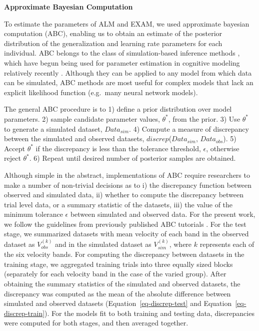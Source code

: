 \documentclass[
  12pt,
  letterpaper,
]{article}
\begin{document}
\begin{tcolorbox}[enhanced jigsaw, toprule=.15mm, leftrule=.75mm, colframe=quarto-callout-color-frame, colback=white, left=2mm, breakable, bottomrule=.15mm, arc=.35mm, opacityback=0, rightrule=.15mm]

\textbf{ Approximate Bayesian Computation}

To estimate the parameters of ALM and EXAM, we used approximate bayesian
computation (ABC), enabling us to obtain an estimate of the posterior
distribution of the generalization and learning rate parameters for each
individual. ABC belongs to the class of simulation-based inference
methods \autocite{cranmerFrontierSimulationbasedInference2020}, which
have begun being used for parameter estimation in cognitive modeling
relatively recently
\autocite{turnerTutorialApproximateBayesian2012,turnerBayesianAnalysisSimulationbased2016,kangasraasioParameterInferenceComputational2019}.
Although they can be applied to any model from which data can be
simulated, ABC methods are most useful for complex models that lack an
explicit likelihood function (e.g.~many neural network models).

The general ABC procedure is to 1) define a prior distribution over
model parameters. 2) sample candidate parameter values, \(\theta^*\),
from the prior. 3) Use \(\theta^*\) to generate a simulated dataset,
\(Data_{sim}\). 4) Compute a measure of discrepancy between the
simulated and observed datasets, \(discrep\)(\(Data_{sim}\),
\(Data_{obs}\)). 5) Accept \(\theta^*\) if the discrepancy is less than
the tolerance threshold, \(\epsilon\), otherwise reject \(\theta^*\). 6)
Repeat until desired number of posterior samples are obtained.

Although simple in the abstract, implementations of ABC require
researchers to make a number of non-trivial decisions as to i) the
discrepancy function between observed and simulated data, ii) whether to
compute the discrepancy between trial level data, or a summary statistic
of the datasets, iii) the value of the minimum tolerance \(\epsilon\)
between simulated and observed data. For the present work, we follow the
guidelines from previously published ABC tutorials
\autocite{turnerTutorialApproximateBayesian2012,farrellComputationalModelingCognition2018}.
For the test stage, we summarized datasets with mean velocity of each
band in the observed dataset as \(V_{obs}^{(k)}\) and in the simulated
dataset as \(V_{sim}^{(k)}\), where \(k\) represents each of the six
velocity bands. For computing the discrepancy between datasets in the
training stage, we aggregated training trials into three equally sized
blocks (separately for each velocity band in the case of the varied
group). After obtaining the summary statistics of the simulated and
observed datasets, the discrepancy was computed as the mean of the
absolute difference between simulated and observed datasets
(Equation~\ref{eq-discrep-test} and Equation~\ref{eq-discrep-train}).
For the models fit to both training and testing data, discrepancies were
computed for both stages, and then averaged together.


\end{tcolorbox}
\end{document}
